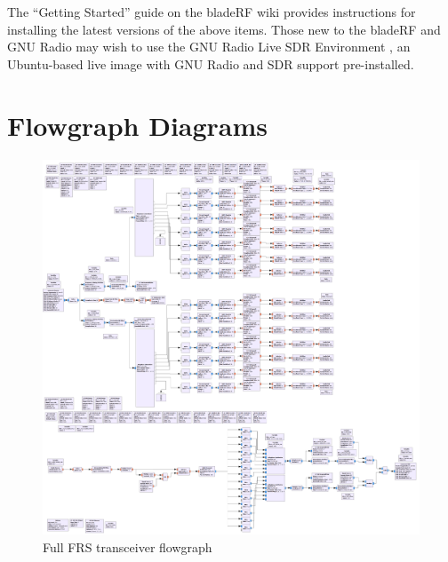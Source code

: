 The ``Getting Started'' guide on the bladeRF wiki
\cite{BLADERF_GETTING_STARTED} provides instructions for installing the latest
versions of the above items. Those new to the bladeRF and GNU Radio may wish to
use the GNU Radio Live SDR Environment \cite{GNU_RADIO_LIVE_IMAGE} , an
Ubuntu-based live image with GNU Radio and SDR support pre-installed.

\newpage
\section{Flowgraph Diagrams} \label{sec:diagrams}
\begin{figure}[h!]
  \label{fig:full_flowgraph}
  \centering
  \includegraphics[width=6.5in]{images/frs/bladeRF_frs_grc.png}
  \caption{Full FRS transceiver flowgraph}
\end{figure}

